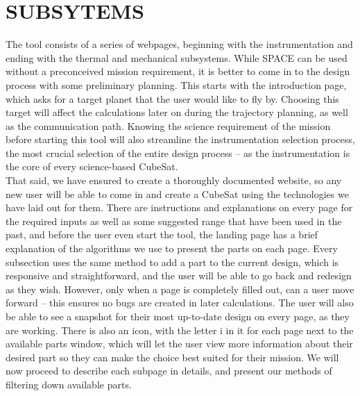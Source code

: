 \documentclass[a4, 12 pt]{article} %
\begin{document}
\section{SUBSYTEMS}
The tool consists of a series of webpages, beginning with the instrumentation and ending with the thermal and mechanical subsystems. While SPACE can be used without a preconceived mission requirement, it is better to come in to the design process with some preliminary planning. This starts with the introduction page, which asks for a target planet that the user would like to fly by. Choosing this target will affect the calculations later on during the trajectory planning, as well as the communication path. Knowing the science requirement of the mission before starting this tool will also streamline the instrumentation selection process, the most crucial selection of the entire design process -- as the instrumentation is the core of every science-based CubeSat.\\[3mm]
That said, we have ensured to create a thoroughly documented website, so any new user will be able to come in and create a CubeSat using the technologies we have laid out for them. There are instructions and explanations on every page for the required inputs as well as some suggested range that have been used in the past, and before the user even start the tool, the landing page has a brief explanation of the algorithms we use to present the parts on each page. Every subsection uses the same method to add a part to the current design, which is responsive and straightforward, and the user will be able to go back and redesign as they wish. However, only when a page is completely filled out, can a user move forward -- this ensures no bugs are created in later calculations. The user will also be able to see a snapshot for their most up-to-date design on every page, as they are working. There is also an icon, with the letter i in it for each page next to the available parts window, which will let the user view more information about their desired part so they can make the choice best suited for their mission.  We will now proceed to describe each subpage in details, and present our methods of filtering down available parts.
\end{document}
